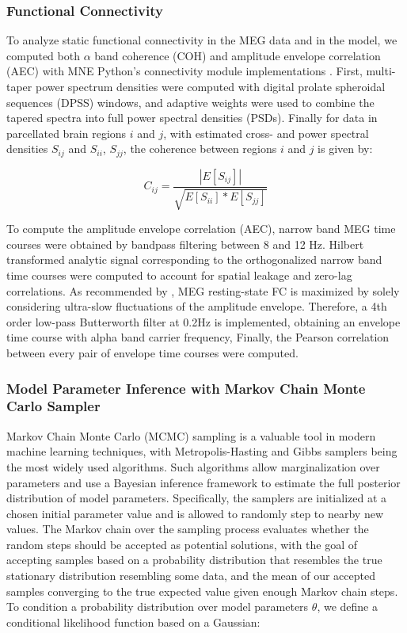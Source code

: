 \subsubsection{Functional Connectivity}
To analyze static functional connectivity in the MEG data and in the model, we computed both $\alpha$ band coherence (COH) and amplitude envelope correlation (AEC) with MNE Python's connectivity module implementations \cite{GramfortEtAl2013a}. First, multi-taper power spectrum densities were computed with digital prolate spheroidal sequences (DPSS) windows, and adaptive weights were used to combine the tapered spectra into full power spectral densities (PSDs). Finally for data in parcellated brain regions $i$ and $j$, with estimated cross- and power spectral densities $S_{ij}$ and $S_{ii}$, $S_{jj}$, the coherence between regions $i$ and $j$ is given by: 

\begin{equation}
    C_{ij} = \frac{|E[S_{ij}]|}{\sqrt{E[S_{ii}] * E[S_{jj}]}}
\end{equation}

To compute the amplitude envelope correlation (AEC), narrow band MEG time courses were obtained by bandpass filtering between 8 and 12 Hz. Hilbert transformed analytic signal corresponding to the orthogonalized narrow band time courses were computed to account for spatial leakage and zero-lag correlations. As recommended by \cite{hipp_large-scale_2012, brookes_measuring_2011, deco_single_2017}, MEG resting-state FC is maximized by solely considering ultra-slow fluctuations of the amplitude envelope. Therefore, a 4th order low-pass Butterworth filter at 0.2Hz is implemented, obtaining an envelope time course with alpha band carrier frequency, Finally, the Pearson correlation between every pair of envelope time courses were computed.

\subsubsection{Model Parameter Inference with Markov Chain Monte Carlo Sampler}
Markov Chain Monte Carlo (MCMC) sampling is a valuable tool in modern machine learning techniques, with Metropolis-Hasting \cite{hastings_monte_1970} and Gibbs \cite{geman_stochastic_1984, gelfand_sampling-based_1990} samplers being the most widely used algorithms. Such algorithms allow marginalization over parameters and use a Bayesian inference framework to estimate the full posterior distribution of model parameters. Specifically, the samplers are initialized at a chosen initial parameter value and is allowed to randomly step to nearby new values. The Markov chain over the sampling process evaluates whether the random steps should be accepted as potential solutions, with the goal of accepting samples based on a probability distribution that resembles the true stationary distribution resembling some data, and the mean of our accepted samples converging to the true expected value given enough Markov chain steps. To condition a probability distribution over model parameters $\theta$, we define a conditional likelihood function based on a Gaussian:

